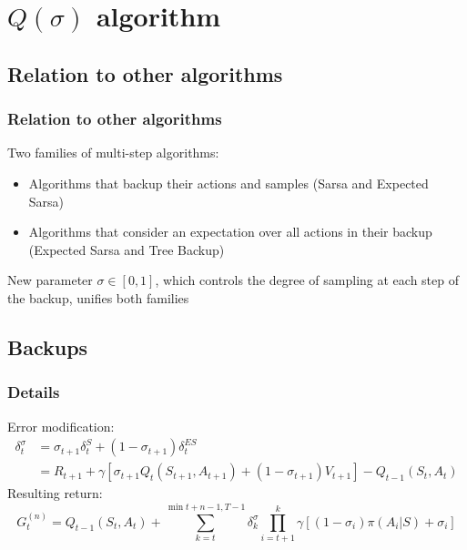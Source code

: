 \documentclass{beamer}
\begin{document}
\section{$Q(\sigma)$ algorithm}

\subsection{Relation to other algorithms}

\begin{frame}
  \frametitle{Relation to other algorithms}
  Two families of multi-step algorithms:
  \begin{itemize}
    \item Algorithms that backup their actions and samples (Sarsa and
      Expected Sarsa)
    \item Algorithms that consider an expectation over all actions in their
      backup (Expected Sarsa and Tree Backup)
  \end{itemize}
  New parameter $\sigma \in [0, 1]$, which controls the degree of sampling at
  each step of the backup, unifies both families
\end{frame}

\subsection{Backups}

\begin{frame}
  \frametitle{Details}
  Error modification:
  \begin{align*}
    \delta_t^{\sigma}
      &= \sigma_{t+1} \delta_{t}^S + (1 - \sigma_{t + 1}) \delta_t^{ES} \\
      &= R_{t + 1} + \gamma [\sigma_{t + 1} Q_t(S_{t + 1}, A_{t + 1}) +
                          (1 - \sigma_{t+ 1}) V_{t + 1}] - Q_{t - 1}(S_t, A_t)
  \end{align*}
  Resulting return:
  $$G_{t}^{(n)} = Q_{t - 1}(S_t, A_t) + \sum_{k = t}^{\min{t + n - 1, T- 1}}
    \delta_k^{\sigma} \prod_{i = t + 1}^{k} \gamma
    [(1 - \sigma_i) \pi (A_i | S) + \sigma_i]$$
\end{frame}
\end{document}
